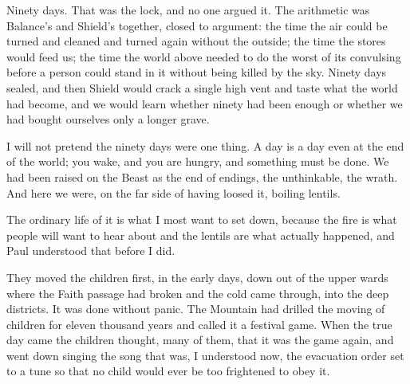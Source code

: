 \ornament

Ninety days. That was the lock, and no one argued it. The arithmetic was Balance's and Shield's together, closed to argument: the time the air could be turned and cleaned and turned again without the outside; the time the stores would feed us; the time the world above needed to do the worst of its convulsing before a person could stand in it without being killed by the sky. Ninety days sealed, and then Shield would crack a single high vent and taste what the world had become, and we would learn whether ninety had been enough or whether we had bought ourselves only a longer grave.\par

I will not pretend the ninety days were one thing. A day is a day even at the end of the world; you wake, and you are hungry, and something must be done. We had been raised on the Beast as the end of endings, the unthinkable, the wrath. And here we were, on the far side of having loosed it, boiling lentils.\par

\ornament

The ordinary life of it is what I most want to set down, because the fire is what people will want to hear about and the lentils are what actually happened, and Paul understood that before I did.\par

They moved the children first, in the early days, down out of the upper wards where the Faith passage had broken and the cold came through, into the deep districts. It was done without panic. The Mountain had drilled the moving of children for eleven thousand years and called it a festival game. When the true day came the children thought, many of them, that it was the game again, and went down singing the song that was, I understood now, the evacuation order set to a tune so that no child would ever be too frightened to obey it.\par

